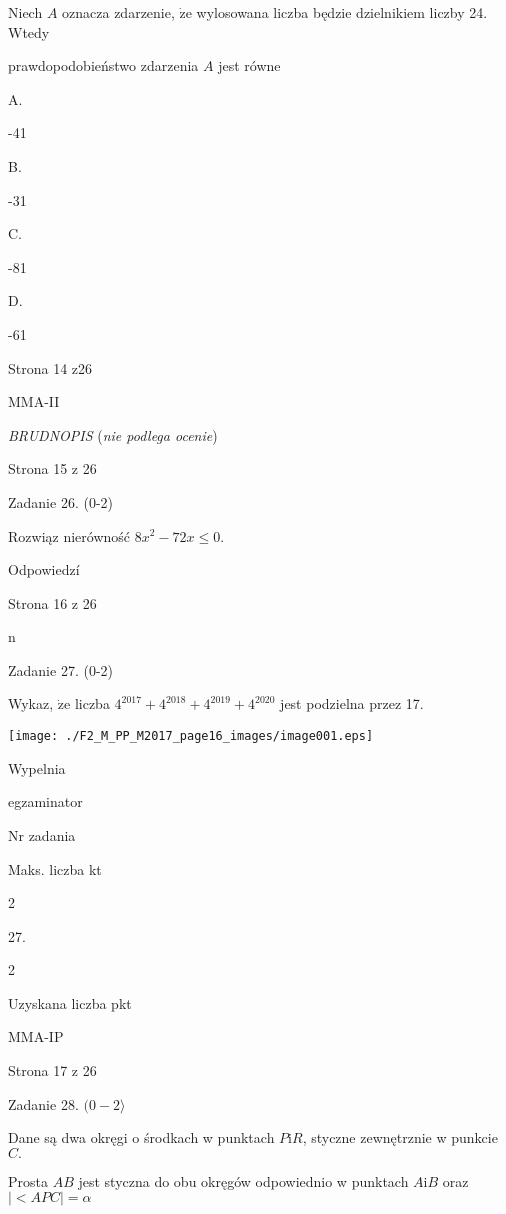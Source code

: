 \documentclass[a4paper,12pt]{article}
\begin{document}
Niech $A$ oznacza zdarzenie, $\dot{\mathrm{z}}\mathrm{e}$ wylosowana liczba będzie dzielnikiem liczby 24. Wtedy

prawdopodobieństwo zdarzenia $A$ jest równe

A.

-41

B.

-31

C.

-81

D.

-61

Strona 14 z26

MMA-II





{\it BRUDNOPIS} ({\it nie podlega ocenie})

Strona 15 z 26





Zadanie 26. (0-2)

Rozwiąz nierówność $8x^{2}-72x\leq 0.$

Odpowiedzí

Strona 16 z 26

n





Zadanie 27. (0-2)

Wykaz, $\dot{\mathrm{z}}\mathrm{e}$ liczba $4^{2017}+4^{2018}+4^{2019}+4^{2020}$ jest podzielna przez 17.
\begin{center}
\texttt{[image: ./F2\_M\_PP\_M2017\_page16\_images/image001.eps]}
\end{center}
Wypelnia

egzaminator

Nr zadania

Maks. liczba kt

2

27.

2

Uzyskana liczba pkt

MMA-IP

Strona 17 z 26





Zadanie 28. $(0-2\rangle$

Dane są dwa okręgi o środkach w punktach $P \mathrm{i} R$, styczne zewnętrznie w punkcie $C.$

Prosta $AB$ jest styczna do obu okręgów odpowiednio w punktach $A \mathrm{i}B$ oraz $|<APC|=\alpha$
\end{document}
